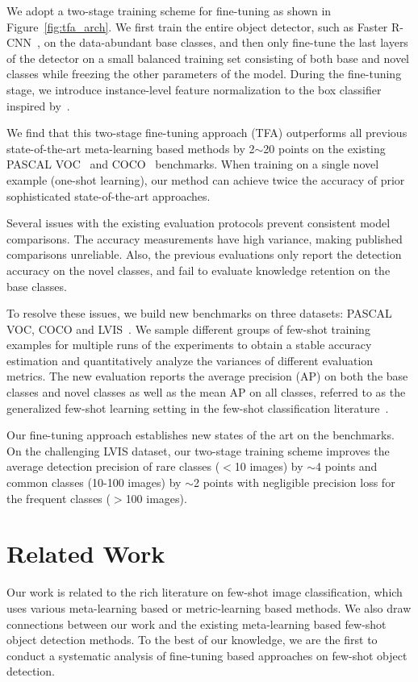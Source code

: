 \documentclass{article}
\newcommand{\model}{TFA\xspace}
\begin{document}
We adopt a two-stage training scheme for fine-tuning as shown in Figure~\ref{fig:tfa_arch}. We first train the entire object detector, such as Faster R-CNN~\cite{ren2015faster}, on the data-abundant base classes, and then only fine-tune the last layers of the detector
on a small balanced training set consisting of both base and novel classes while freezing the other parameters of the model. 
During the fine-tuning stage, we introduce instance-level feature normalization to the box classifier inspired by~\citet{gidaris2018dynamic,qi2018low,chen2019closer}. 


We find that this two-stage fine-tuning approach (\model) outperforms all previous
state-of-the-art meta-learning based methods by 2$\sim$20 points on the existing PASCAL
VOC~\cite{pascal-voc-2007} and COCO~\cite{Lin2014MicrosoftCC} benchmarks. 
When training on a single novel example (one-shot learning), our method can achieve twice
the accuracy of prior sophisticated state-of-the-art approaches.



Several issues with the existing evaluation protocols prevent consistent model comparisons. The accuracy measurements have high variance, making published comparisons unreliable.  Also, the previous evaluations only report the detection accuracy on the novel classes, and fail to evaluate knowledge retention on the base classes.


To resolve these issues, we build new benchmarks on three datasets: PASCAL VOC, COCO and LVIS~\cite{gupta2019lvis}.
We sample different groups of few-shot training examples for multiple runs of the experiments to obtain a stable accuracy estimation and quantitatively analyze the variances of different evaluation metrics. The new evaluation reports the average precision (AP) on both the base classes and novel classes as well as the mean AP on all classes, referred to as the generalized few-shot learning setting in the few-shot classification literature~\cite{hariharan2017low,wang2019tafe}.

Our fine-tuning approach establishes new states of the art on the benchmarks.  
On the challenging LVIS dataset, our two-stage training scheme improves the average detection precision of rare classes
($<$10 images) by $\sim$4 points and common classes (10-100 images) by $\sim$2 points with negligible precision loss for the frequent classes ($>$100 images). 
 \section{Related Work}
Our work is related to the rich literature on few-shot image classification, which uses various 
meta-learning based or metric-learning based methods. We also draw connections between our work and the existing meta-learning based few-shot object detection methods. To the best of our knowledge, we are the first to conduct a systematic analysis of fine-tuning based approaches on few-shot object detection. 
\end{document}
